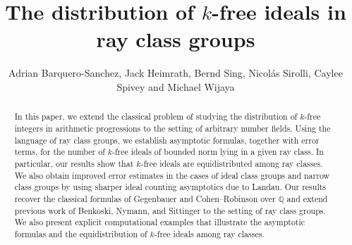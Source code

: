 \documentclass[11pt, reqno]{amsart}
\numberwithin{equation}{section}
\theoremstyle{definition}
\begin{document}
\title{The distribution of $k$-free ideals in ray class groups}

\author[]{Adrian Barquero-Sanchez, Jack Heimrath, Bernd Sing, Nicolás Sirolli, Caylee Spivey and Michael Wijaya}


\address{Escuela de Matem\'atica, Universidad de Costa Rica, San Jos\'e 11501, Costa Rica}
\address{Centro de Investigación en Matemática Pura y Aplicada, Universidad de Costa Rica, San Jos\'e 2060, Costa Rica}

\address{Department of Mathematics and Statistics, Queen’s University, Kingston, Ontario, Canada}

\address{Department of Mathematics, University of the West Indies, Cave Hill, P.O. Box 64, Bridgetown, BB11000, Barbados}

\address{Departamento de Matemática, FCEyN, UBA and IMAS, CONICET -- Pabellón I, Ciudad Universitaria, Ciudad Autónoma de Buenos Aires (1428), Argentina}

\address{Department of Mathematics, University of Connecticut, Storrs, CT 06268, USA}


\address{Department of Mathematics, Trinity School, New York, NY 10024, USA}





\begin{abstract}
In this paper, we extend the classical problem of studying the distribution of $k$-free integers in arithmetic progressions to the setting of arbitrary number fields. Using the language of ray class groups, we establish asymptotic formulas, together with error terms, for the number of $k$-free ideals of bounded norm lying in a given ray class. In particular, our results show that $k$-free ideals are equidistributed among ray classes. We also obtain improved error estimates in the cases of ideal class groups and narrow class groups by using sharper ideal counting asymptotics due to Landau.
Our results recover the classical formulas of Gegenbauer and Cohen--Robinson over $\mathbb{Q}$ and extend previous work of Benkoski, Nymann, and Sittinger to the setting of ray class groups. We also present explicit computational examples that illustrate the asymptotic formulas and the equidistribution of $k$-free ideals among ray classes.
\end{abstract}
\end{document}
